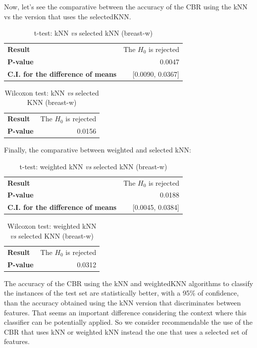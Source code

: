 \documentclass[12pt, a4paper]{article}
\begin{document}
Now, let’s see the comparative between the accuracy of the CBR using the kNN vs the version that uses the selectedKNN.\\
\begin{table}[ht!]
	\centering
	\small
	\begin{tabular}{|lr|}
		\hline
		\textbf{Result} & The $H_0$ is rejected\\
		\textbf{P-value} & 0.0047\\
		\textbf{C.I. for the difference of means} & [0.0090, 0.0367]\\
		\hline
	\end{tabular}
	\caption{t-test: kNN \emph{vs} selected kNN (breast-w)}
\end{table}
\begin{table}[ht!]
	\centering
	\small
	\begin{tabular}{|lr|}
		\hline
		\textbf{Result} & The $H_0$ is rejected\\
		\textbf{P-value} & 0.0156\\
		\hline
	\end{tabular}
	\caption{Wilcoxon test: kNN \emph{vs} selected KNN (breast-w)}
\end{table}

Finally, the comparative between weighted and selected kNN:
\begin{table}[ht!]
	\centering
	\small
	\begin{tabular}{|lr|}
		\hline
		\textbf{Result} & The $H_0$ is rejected\\
		\textbf{P-value} & 0.0188\\
		\textbf{C.I. for the difference of means} & [0.0045, 0.0384]\\
		\hline
	\end{tabular}
	\caption{t-test: weighted kNN \emph{vs} selected kNN (breast-w)}
\end{table}
\begin{table}[ht!]
	\centering
	\small
	\begin{tabular}{|lr|}
		\hline
		\textbf{Result} & The $H_0$ is rejected\\
		\textbf{P-value} & 0.0312\\
		\hline
	\end{tabular}
	\caption{Wilcoxon test: weighted kNN \emph{vs} selected KNN (breast-w)}
\end{table}

The accuracy of the CBR using the kNN and weightedKNN algorithms to classify the instances of the test set are statistically better, with a 95\% of confidence, than the accuracy obtained using the kNN version that discriminates between features. That seems an important difference considering the context where this classifier can be potentially applied. So we consider recommendable the use of the CBR that uses kNN or weighted kNN instead the one that uses a selected set of features.\\
\end{document}
